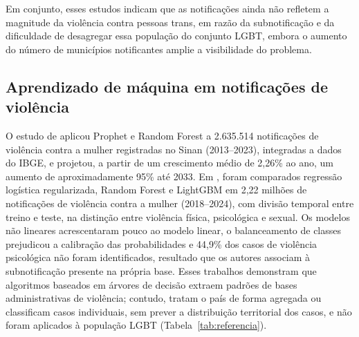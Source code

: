 \documentclass[12pt]{article}
\begin{document}
Em conjunto, esses estudos indicam que as notificações ainda não refletem a magnitude da violência contra pessoas trans, em razão da subnotificação e da dificuldade de desagregar essa população do conjunto LGBT, embora o aumento do número de municípios notificantes amplie a visibilidade do problema.

\subsection{Aprendizado de máquina em notificações de violência}

O estudo de \cite{coelho_jiv:2025} aplicou Prophet e Random Forest a 2.635.514 notificações de violência contra a mulher registradas no Sinan (2013--2023), integradas a dados do IBGE, e projetou, a partir de um crescimento médio de 2,26\% ao ano, um aumento de aproximadamente 95\% até 2033. Em \cite{lucca_romero_sbbd:2026}, foram comparados regressão logística regularizada, Random Forest e LightGBM em 2,22 milhões de notificações de violência contra a mulher (2018--2024), com divisão temporal entre treino e teste, na distinção entre violência física, psicológica e sexual. Os modelos não lineares acrescentaram pouco ao modelo linear, o balanceamento de classes prejudicou a calibração das probabilidades e 44,9\% dos casos de violência psicológica não foram identificados, resultado que os autores associam à subnotificação presente na própria base. Esses trabalhos demonstram que algoritmos baseados em árvores de decisão extraem padrões de bases administrativas de violência; contudo, tratam o país de forma agregada ou classificam casos individuais, sem prever a distribuição territorial dos casos, e não foram aplicados à população LGBT (Tabela~\ref{tab:referencia}).
\end{document}

